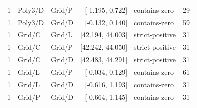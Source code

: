 \begin{longtable}{lllrlr}
1 & Poly3/D & Grid/P & [-1.195, 0.722] & contains-zero & 29 \\
1 & Poly3/D & Grid/D & [-0.132, 0.140] & contains-zero & 59 \\
1 & Grid/C & Grid/L & [42.194, 44.003] & strict-positive & 31 \\
1 & Grid/C & Grid/P & [42.242, 44.050] & strict-positive & 31 \\
1 & Grid/C & Grid/D & [42.483, 44.291] & strict-positive & 31 \\
1 & Grid/L & Grid/P & [-0.034, 0.129] & contains-zero & 61 \\
1 & Grid/L & Grid/D & [-0.616, 1.193] & contains-zero & 31 \\
1 & Grid/P & Grid/D & [-0.664, 1.145] & contains-zero & 31 \\
\end{longtable}
\endgroup


